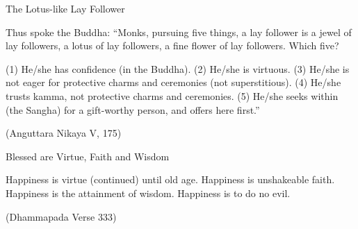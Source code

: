 The Lotus-like Lay Follower

Thus spoke the Buddha: “Monks, pursuing five things, a lay follower is a jewel of lay followers, a lotus of lay followers, a fine flower of lay followers. Which five?

(1) He/she has confidence (in the Buddha).
(2) He/she is virtuous.
(3) He/she is not eager for protective charms and ceremonies (not superstitious).
(4) He/she trusts kamma, not protective charms and ceremonies.
(5) He/she seeks within (the Sangha) for a gift-worthy person, and offers here first.”

(Anguttara Nikaya V, 175)


Blessed are Virtue, Faith and Wisdom

Happiness is virtue (continued) until old age. Happiness is unshakeable faith. Happiness is the attainment of wisdom. Happiness is to do no evil.

(Dhammapada Verse 333)

